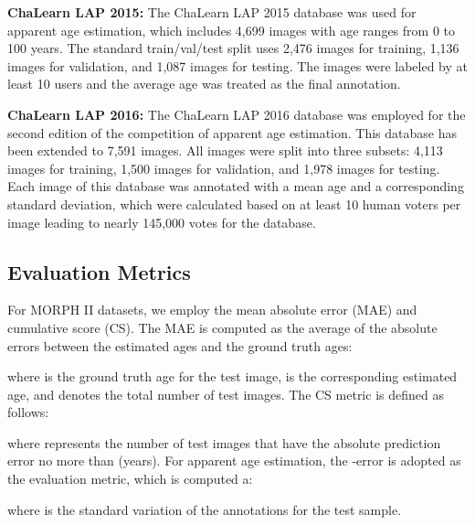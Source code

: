 \documentclass[journal,twoside]{IEEEtran}
\begin{document}
\textbf{ChaLearn LAP 2015:} The ChaLearn LAP 2015 database \cite{escalera2015chalearn} was used for apparent age estimation, which includes 4,699 images with age ranges from 0 to 100 years.  The standard train/val/test split uses 2,476 images for training, 1,136 images for validation, and 1,087 images for testing. The images were labeled by at least 10 users and the average age was treated as the final annotation.

\textbf{ChaLearn LAP 2016:} The ChaLearn LAP 2016 database \cite{escalera2016chalearn} was employed for the second edition of the competition of apparent age estimation. This database has been extended to 7,591 images. All images were split into three subsets: 4,113 images for training, 1,500 images for validation, and 1,978 images for testing. Each image of this database was annotated with a mean age and a corresponding standard deviation, which were calculated based on at least 10 human voters per image leading to nearly 145,000 votes for the database.

\subsection{Evaluation Metrics}
For MORPH II datasets, we employ the mean absolute error (MAE) and cumulative score (CS). The MAE is computed as the average of the absolute errors between the estimated ages and the ground truth ages:

where  is the ground truth age for the  test image,  is the corresponding estimated age, and  denotes the total number of test images. The CS metric is defined as follows:

where  represents the number of test images that have the absolute prediction error no more than  (years). For apparent age estimation, the -error is adopted as the evaluation metric, which is computed a:

where  is the standard variation of the annotations for the  test sample.
\end{document}
